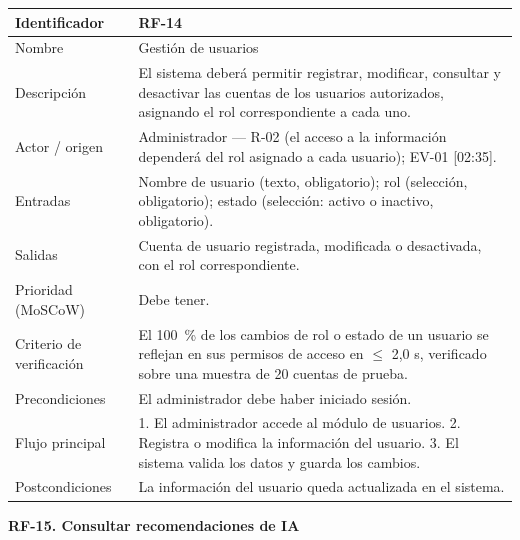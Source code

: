 \documentclass[12pt,a4paper]{article}
\begin{document}
\begin{center}
\begin{longtable}{|p{3.5cm}|p{10.7cm}|}
\hline
Identificador & RF-14 \\
\hline
Nombre & Gestión de usuarios \\
\hline
Descripción & El sistema deberá permitir registrar, modificar, consultar y desactivar las cuentas de los usuarios autorizados, asignando el rol correspondiente a cada uno. \\
\hline
Actor / origen & Administrador --- R-02 (el acceso a la información dependerá del rol asignado a cada usuario); EV-01 [02:35]. \\
\hline
Entradas & Nombre de usuario (texto, obligatorio); rol (selección, obligatorio); estado (selección: activo o inactivo, obligatorio). \\
\hline
Salidas & Cuenta de usuario registrada, modificada o desactivada, con el rol correspondiente. \\
\hline
Prioridad (MoSCoW) & Debe tener. \\
\hline
Criterio de verificación & El 100~\% de los cambios de rol o estado de un usuario se reflejan en sus permisos de acceso en $\leq$ 2,0 s, verificado sobre una muestra de 20 cuentas de prueba. \\
\hline
Precondiciones & El administrador debe haber iniciado sesión. \\
\hline
Flujo principal & 1. El administrador accede al módulo de usuarios. 2. Registra o modifica la información del usuario. 3. El sistema valida los datos y guarda los cambios. \\
\hline
Postcondiciones & La información del usuario queda actualizada en el sistema. \\
\hline
\end{longtable}
\end{center}

\bigskip
\noindent\textbf{RF-15. Consultar recomendaciones de IA}
\label{tab:RF-15}
\end{document}
